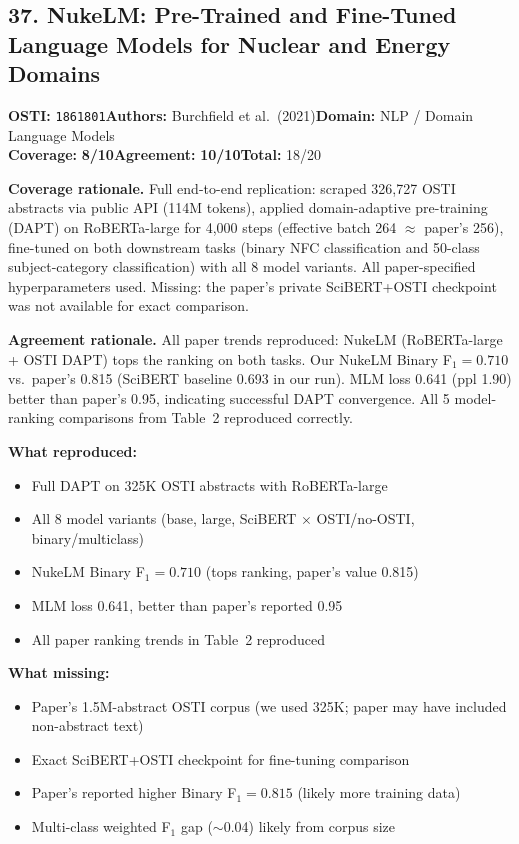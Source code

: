 \documentclass[11pt]{article}
\newcommand{\scorebadge}[2]{\textbf{#1:} \textbf{#2/10}}
\begin{document}
\subsection{37. NukeLM: Pre-Trained and Fine-Tuned Language Models for Nuclear and Energy Domains}
\textbf{OSTI:} \texttt{1861801}\quad\textbf{Authors:} Burchfield et al.\ (2021)\quad\textbf{Domain:} NLP / Domain Language Models\\
\scorebadge{Coverage}{8}\quad\scorebadge{Agreement}{10}\quad\textbf{Total:} 18/20\par\smallskip
\noindent\textbf{Coverage rationale.} Full end-to-end replication: scraped 326,727 OSTI abstracts via public API (114M tokens), applied domain-adaptive pre-training (DAPT) on RoBERTa-large for 4,000 steps (effective batch 264 $\approx$ paper's 256), fine-tuned on both downstream tasks (binary NFC classification and 50-class subject-category classification) with all 8 model variants. All paper-specified hyperparameters used. Missing: the paper's private SciBERT+OSTI checkpoint was not available for exact comparison.\par
\noindent\textbf{Agreement rationale.} All paper trends reproduced: NukeLM (RoBERTa-large + OSTI DAPT) tops the ranking on both tasks. Our NukeLM Binary F$_1=0.710$ vs.\ paper's 0.815 (SciBERT baseline 0.693 in our run). MLM loss 0.641 (ppl 1.90) better than paper's 0.95, indicating successful DAPT convergence. All 5 model-ranking comparisons from Table~2 reproduced correctly.\par\smallskip
\noindent\textbf{What reproduced:}
\begin{itemize}[leftmargin=1.4em,itemsep=0.2em,topsep=0.2em]
\item Full DAPT on 325K OSTI abstracts with RoBERTa-large
\item All 8 model variants (base, large, SciBERT $\times$ OSTI/no-OSTI, binary/multiclass)
\item NukeLM Binary F$_1 = 0.710$ (tops ranking, paper's value 0.815)
\item MLM loss 0.641, better than paper's reported 0.95
\item All paper ranking trends in Table~2 reproduced
\end{itemize}
\noindent\textbf{What missing:}
\begin{itemize}[leftmargin=1.4em,itemsep=0.2em,topsep=0.2em]
\item Paper's 1.5M-abstract OSTI corpus (we used 325K; paper may have included non-abstract text)
\item Exact SciBERT+OSTI checkpoint for fine-tuning comparison
\item Paper's reported higher Binary F$_1 = 0.815$ (likely more training data)
\item Multi-class weighted F$_1$ gap ($\sim$0.04) likely from corpus size
\end{itemize}
\end{document}
